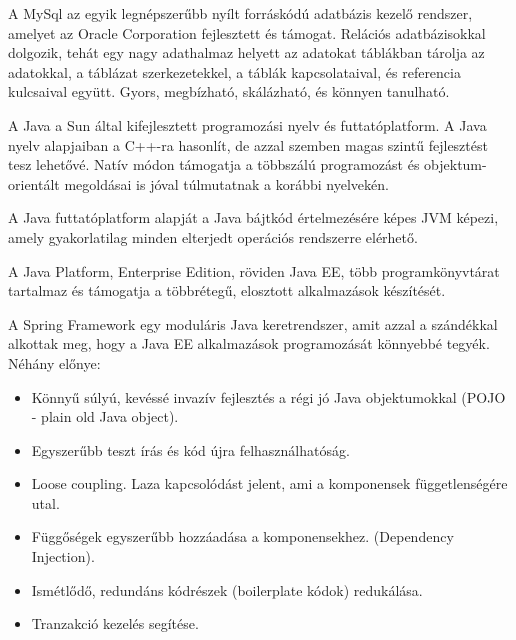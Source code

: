 



A MySql az egyik legnépszerűbb nyílt forráskódú adatbázis kezelő rendszer, amelyet az Oracle Corporation fejlesztett és támogat. Relációs adatbázisokkal dolgozik, tehát egy nagy adathalmaz helyett az adatokat táblákban tárolja az adatokkal, a táblázat szerkezetekkel, a táblák kapcsolataival, és referencia kulcsaival együtt. Gyors, megbízható, skálázható, és könnyen tanulható. \cite{mysql} 

A Java a Sun által kifejlesztett programozási nyelv és futtatóplatform. A Java nyelv alapjaiban a C++-ra hasonlít, de azzal szemben magas szintű fejlesztést tesz lehetővé. Natív módon támogatja a többszálú programozást és objektum-orientált megoldásai is jóval túlmutatnak a korábbi nyelvekén.

A Java futtatóplatform alapját a Java bájtkód értelmezésére képes JVM képezi, amely gyakorlatilag minden elterjedt operációs rendszerre elérhető. \cite{javaee}

A Java Platform, Enterprise Edition, röviden Java EE, több programkönyvtárat tartalmaz és támogatja a többrétegű, elosztott alkalmazások készítését.

A Spring Framework egy moduláris Java keretrendszer, amit azzal a szándékkal alkottak meg, hogy a Java EE alkalmazások programozását könnyebbé tegyék. Néhány előnye:
\begin{itemize}
	\item Könnyű súlyú, kevéssé invazív fejlesztés a régi jó Java objektumokkal (POJO - plain old Java object).
	\item Egyszerűbb teszt írás és kód újra felhasználhatóság.
	\item Loose coupling. Laza kapcsolódást jelent, ami a komponensek függetlenségére utal.
	\item Függőségek egyszerűbb hozzáadása a komponensekhez. (Dependency Injection).
	\item Ismétlődő, redundáns kódrészek (boilerplate kódok) redukálása.
	\item Tranzakció kezelés segítése. \cite{spring}
\end{itemize}

